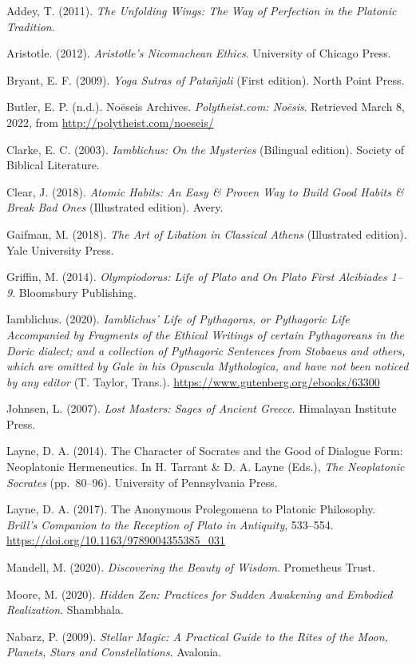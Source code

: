 \documentclass[
]{book}
\begin{document}
Addey, T. (2011). \emph{The Unfolding Wings: The Way of Perfection in the Platonic Tradition}.

Aristotle. (2012). \emph{Aristotle's Nicomachean Ethics}. University of Chicago Press.

Bryant, E. F. (2009). \emph{Yoga Sutras of Patañjali} (First edition). North Point Press.

Butler, E. P. (n.d.). Noēseis Archives. \emph{Polytheist.com: Noēsis}. Retrieved March 8, 2022, from \url{http://polytheist.com/noeseis/}

Clarke, E. C. (2003). \emph{Iamblichus: On the Mysteries} (Bilingual edition). Society of Biblical Literature.

Clear, J. (2018). \emph{Atomic Habits: An Easy \& Proven Way to Build Good Habits \& Break Bad Ones} (Illustrated edition). Avery.

Gaifman, M. (2018). \emph{The Art of Libation in Classical Athens} (Illustrated edition). Yale University Press.

Griffin, M. (2014). \emph{Olympiodorus: Life of Plato and On Plato First Alcibiades 1--9}. Bloomsbury Publishing.

Iamblichus. (2020). \emph{Iamblichus' Life of Pythagoras, or Pythagoric Life Accompanied by Fragments of the Ethical Writings of certain Pythagoreans in the Doric dialect; and a collection of Pythagoric Sentences from Stobaeus and others, which are omitted by Gale in his Opuscula Mythologica, and have not been noticed by any editor} (T. Taylor, Trans.). \url{https://www.gutenberg.org/ebooks/63300}

Johnsen, L. (2007). \emph{Lost Masters: Sages of Ancient Greece}. Himalayan Institute Press.

Layne, D. A. (2014). The Character of Socrates and the Good of Dialogue Form: Neoplatonic Hermeneutics. In H. Tarrant \& D. A. Layne (Eds.), \emph{The Neoplatonic Socrates} (pp.~80--96). University of Pennsylvania Press.

Layne, D. A. (2017). The Anonymous Prolegomena to Platonic Philosophy. \emph{Brill's Companion to the Reception of Plato in Antiquity}, 533--554. \url{https://doi.org/10.1163/9789004355385_031}

Mandell, M. (2020). \emph{Discovering the Beauty of Wisdom}. Prometheus Trust.

Moore, M. (2020). \emph{Hidden Zen: Practices for Sudden Awakening and Embodied Realization}. Shambhala.

Nabarz, P. (2009). \emph{Stellar Magic: A Practical Guide to the Rites of the Moon, Planets, Stars and Constellations}. Avalonia.
\end{document}
